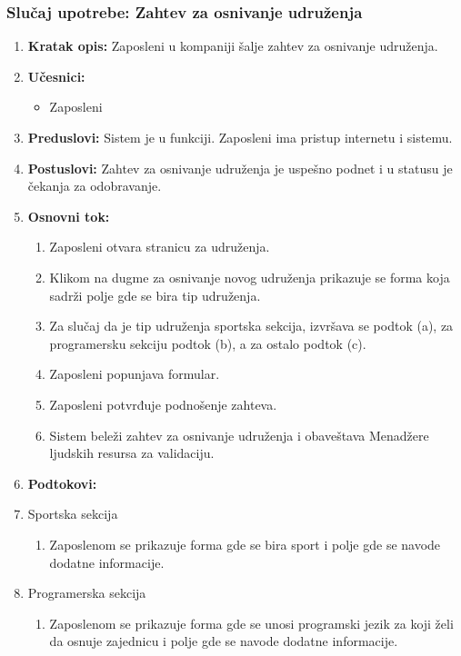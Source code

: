 \documentclass[a4paper]{article}
\begin{document}
\subsubsection{Slučaj upotrebe: Zahtev za osnivanje udruženja}
\begin{enumerate}
    \item \textbf{Kratak opis:} Zaposleni u kompaniji šalje zahtev za osnivanje udruženja.
    \item \textbf{Učesnici:}
        \begin{itemize}
            \item Zaposleni
        \end{itemize}
    \item \textbf{Preduslovi:} Sistem je u funkciji. Zaposleni ima pristup internetu i sistemu.
    \item \textbf{Postuslovi:} Zahtev za osnivanje udruženja je uspešno podnet i u statusu je čekanja za odobravanje.
    \item \textbf{Osnovni tok:}
        \begin{enumerate}
            \item Zaposleni otvara stranicu za udruženja.
            \item Klikom na dugme za osnivanje novog udruženja prikazuje se forma koja sadrži polje gde se bira tip udruženja.
            \item Za slučaj da je tip udruženja sportska sekcija, izvršava se podtok (a), za programersku sekciju podtok (b), a za ostalo podtok (c).
            \item Zaposleni popunjava formular.
            \item Zaposleni potvrđuje podnošenje zahteva.
            \item Sistem beleži zahtev za osnivanje udruženja i obaveštava Menadžere ljudskih resursa za validaciju.
        \end{enumerate}
    \item \textbf{Podtokovi:}
        \item Sportska sekcija
            \begin{enumerate}
                \item Zaposlenom se prikazuje forma gde se bira sport i polje gde se navode dodatne informacije.
            \end{enumerate}
        \item Programerska sekcija
            \begin{enumerate}
                \item Zaposlenom se prikazuje forma gde se unosi programski jezik za koji želi da osnuje zajednicu i polje gde se navode dodatne informacije.

\end{enumerate}
\end{enumerate}
\end{document}
